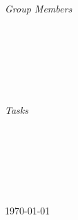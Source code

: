 \begin{titlepage}

\begin{minipage}{0.4\textwidth}
\begin{flushleft} \large
\emph{Group Members}\\
\\[1.2em]
\\[1.2em]
\\[1.2em]
\@author\\[1.2em] %
\end{flushleft}
\end{minipage}
~
\begin{minipage}{0.4\textwidth}
\begin{flushright} \large
\emph{Tasks} \\
 \\[1.2em] 
 \\[1.2em] 
\\[1.2em] 
 \\[1.2em] 
\end{flushright}
\end{minipage}\\[2cm]
\makeatother


{\large \today}\\[2cm] %

\vfill %

\end{titlepage}